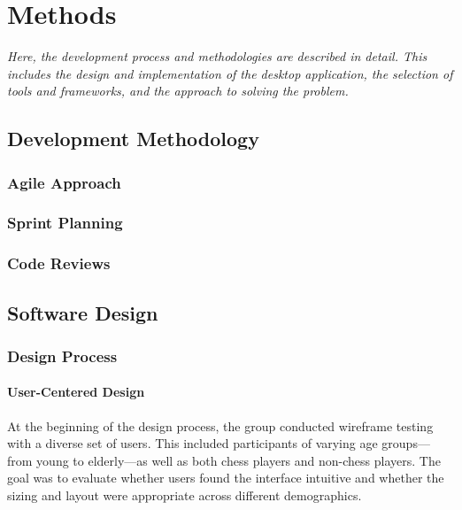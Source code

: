 \chapter{Methods}
\label{chp:methods}

\begin{center}
    \textit{Here, the development process and methodologies are described in detail. This includes the design and implementation of the desktop application, the selection of tools and frameworks, and the approach to solving the problem.}
\end{center}

\section{Development Methodology}
\label{sec:development-methodology}

\subsection{Agile Approach}
\label{subsec:agile-approach}

\subsection{Sprint Planning}
\label{subsec:sprint-planning}

\subsection{Code Reviews}
\label{subsec:code-review}

\section{Software Design}
\label{sec:software-design}

\subsection{Design Process}
\label{subsec:design-process}

\subsubsection*{User-Centered Design}
\label{subsubsec:user-centered-design}

At the beginning of the design process, the group conducted wireframe testing with a diverse set of users. This included participants of varying age groups—from young to elderly—as well as both chess players and non-chess players. The goal was to evaluate whether users found the interface intuitive and whether the sizing and layout were appropriate across different demographics. \\

